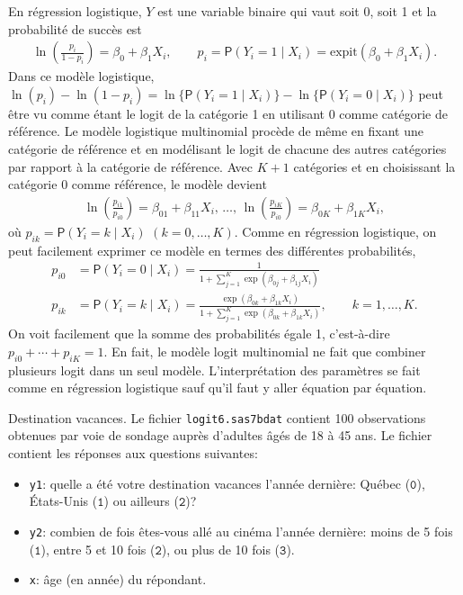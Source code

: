 \documentclass[
  11pt,
  letterpaper,
]{book}
\providecommand{\tightlist}{%
  \setlength{\itemsep}{0pt}\setlength{\parskip}{0pt}}
\theoremstyle{definition}
\theoremstyle{definition}
\theoremstyle{definition}
\theoremstyle{remark}
\begin{document}
En régression logistique, \(Y\) est une variable binaire qui vaut soit 0, soit 1 et la probabilité de succès est
\begin{align*}
\ln\left(\frac{p_i}{1-p_i}\right) = \beta_0 + \beta_1 X_{i}, \qquad p_i = {\mathsf P}\left(Y_i=1 \mid X_i\right) = \mathrm{expit}(\beta_0 + \beta_1X_i).
\end{align*}
Dans ce modèle logistique, \(\ln(p_i)-\ln(1-p_i) = \ln\{{\mathsf P}\left(Y_i=1 \mid X_i\right)\} - \ln\{{\mathsf P}\left(Y_i=0 \mid X_i\right)\}\) peut être vu comme étant le logit de la catégorie 1 en utilisant 0 comme catégorie de référence.
Le modèle logistique multinomial procède de même en fixant une catégorie de référence et en modélisant le logit de chacune des autres catégories par rapport à la catégorie de référence. Avec \(K+1\) catégories et en choisissant la catégorie 0 comme référence, le modèle devient
\begin{align*}
 \ln\left(\frac{p_{i1}}{p_{i0}}\right) = \beta_{01} + \beta_{11} X_i, \, \ldots, \, \ln\left(\frac{p_{iK}}{p_{i0}}\right) = \beta_{0K} + \beta_{1K} X_i,
\end{align*}
où \(p_{ik} = {\mathsf P}\left(Y_i=k \mid X_i\right)\) \((k=0, \ldots, K)\). Comme en régression logistique, on peut facilement exprimer ce modèle en termes des différentes probabilités,
\begin{align*}
 p_{i0} &= {\mathsf P}\left(Y_i=0 \mid X_i\right) = \frac{1}{1+ \sum_{j=1}^K\exp(\beta_{0j}+\beta_{1j}X_i)}\\
 p_{ik} &= {\mathsf P}\left(Y_i=k \mid X_i\right) = \frac{\exp(\beta_{0k}+\beta_{1k}X_i)}{1+ \sum_{j=1}^K\exp(\beta_{0k}+\beta_{1k}X_i)}, \qquad k =1, \ldots, K.
\end{align*}
On voit facilement que la somme des probabilités égale 1, c'est-à-dire \(p_{i0} + \cdots + p_{iK} = 1\). En fait, le modèle logit multinomial ne fait que combiner plusieurs logit dans un seul modèle. L'interprétation des paramètres se fait comme en régression logistique sauf qu'il faut y aller équation par équation.

Destination vacances. Le fichier \texttt{logit6.sas7bdat} contient 100 observations obtenues par voie de sondage auprès d'adultes âgés de 18 à 45 ans. Le fichier contient les réponses aux questions suivantes:

\begin{itemize}
\tightlist
\item
  \texttt{y1}: quelle a été votre destination vacances l'année dernière: Québec (\(\texttt{0}\)), États-Unis (\(\texttt{1}\)) ou ailleurs (\(\texttt{2}\))?
\item
  \texttt{y2}: combien de fois êtes-vous allé au cinéma l'année dernière: moins de 5 fois (\(\texttt{1}\)), entre 5 et 10 fois (\(\texttt{2}\)), ou plus de 10 fois (\(\texttt{3}\)).
\item
  \texttt{x}: âge (en année) du répondant.
\end{itemize}
\end{document}
